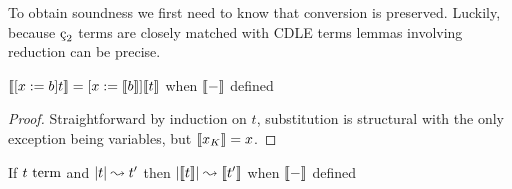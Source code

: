 To obtain soundness we first need to know that conversion is preserved.
Luckily, because $\ced$ terms are closely matched with CDLE terms lemmas involving reduction can be precise.

\begin{lemma}
    \label{lem:4:sema_subst}
    $\llbracket [x := b]t \rrbracket = [x := \llbracket b \rrbracket]\llbracket t \rrbracket$ when $\llbracket - \rrbracket$ defined
\end{lemma}
\begin{proof}
    Straightforward by induction on $t$, substitution is structural with the only exception being variables, but $\llbracket x_K \rrbracket = x$.
\end{proof}

\begin{lemma}
    \label{lem:4:sema_term_step}
    If $t~\textnormal{term}$ and $|t| \leadsto t^\prime$ then $|\llbracket t \rrbracket| \leadsto \llbracket t^\prime \rrbracket$ when $\llbracket - \rrbracket$ defined
\end{lemma}
